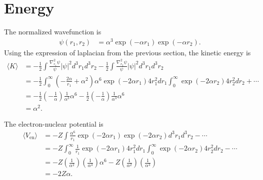 \section{Energy}
The normalized wavefunction is
\begin{align}
\psi(r_1, r_2) &= \alpha^3 \exp(-\alpha r_1) \exp(-\alpha r_2).
\end{align}
Using the expression of laplacian from the previous section, the kinetic energy is
\begin{align}
\langle K \rangle &= -\frac{1}{2}\int \frac{\nabla_{r_1}^2 \psi}{\psi} |\psi|^2 d^3 r_1 d^3 r_2 -\frac{1}{2}\int \frac{\nabla_{r_2}^2 \psi}{\psi} |\psi|^2 d^3 r_1 d^3 r_2 \\
&= -\frac{1}{2} \int_0^{\infty}  \left(-\frac{2 \alpha}{r_1} + \alpha^2\right) \alpha^6 \exp(-2 \alpha r_1) 4 r_1^2 dr_1 \int_0^{\infty} \exp(-2 \alpha r_2) 4r_2^2 dr_2 + \cdots \\
&= -\frac{1}{2} \left(-\frac{1}{\alpha}\right) \frac{1}{\alpha^3} \alpha^6 -\frac{1}{2} \left(-\frac{1}{\alpha}\right) \frac{1}{\alpha^3} \alpha^6 \\
&= \boxed{\alpha^2}.
\end{align}

The electron-nuclear potential is
\begin{align}
\langle V_{\mathrm{en}} \rangle &= -Z\int \frac{\alpha^6}{r_1} \exp(-2 \alpha r_1) \exp(-2 \alpha r_2) d^3 r_1 d^3 r_2 - \cdots \\
&= -Z\int_0^{\infty} \frac{1}{r_1} \exp(-2 \alpha r_1) 4r_1^2 dr_1 \int_0^{\infty} \exp(-2 \alpha r_2) 4 r_2^2 d r_2 - \cdots \\
&= -Z \left(\frac{1}{\alpha^2} \right) \left(\frac{1}{\alpha^3} \right) \alpha^6 - Z \left(\frac{1}{\alpha^2} \right) \left(\frac{1}{\alpha^3} \right) \\
&= \boxed{-2 Z \alpha}.
\end{align}